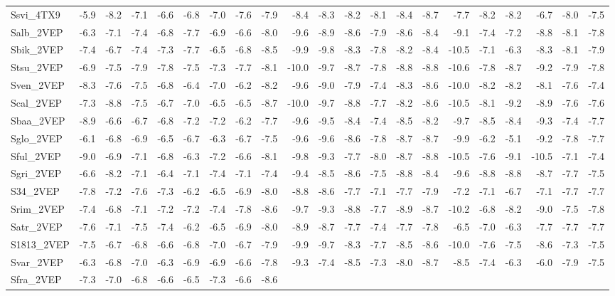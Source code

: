 \documentclass[12pt,twoside]{reedthesis}
\begin{document}
\begin{longtable}[]{@{}lrrrrrrrrrrrrrrrrrrrr@{}}
  Ssvi\_4TX9 & -5.9 & -8.2 & -7.1 & -6.6 & -6.8 & -7.0 & -7.6 & -7.9 &
  -8.4 & -8.3 & -8.2 & -8.1 & -8.4 & -8.7 & -7.7 & -8.2 & -8.2 & -6.7 &
  -8.0 & -7.5\tabularnewline
  Salb\_2VEP & -6.3 & -7.1 & -7.4 & -6.8 & -7.7 & -6.9 & -6.6 & -8.0 &
  -9.6 & -8.9 & -8.6 & -7.9 & -8.6 & -8.4 & -9.1 & -7.4 & -7.2 & -8.8 &
  -8.1 & -7.8\tabularnewline
  Sbik\_2VEP & -7.4 & -6.7 & -7.4 & -7.3 & -7.7 & -6.5 & -6.8 & -8.5 &
  -9.9 & -9.8 & -8.3 & -7.8 & -8.2 & -8.4 & -10.5 & -7.1 & -6.3 & -8.3 &
  -8.1 & -7.9\tabularnewline
  Stsu\_2VEP & -6.9 & -7.5 & -7.9 & -7.8 & -7.5 & -7.3 & -7.7 & -8.1 &
  -10.0 & -9.7 & -8.7 & -7.8 & -8.8 & -8.8 & -10.6 & -7.8 & -8.7 & -9.2 &
  -7.9 & -7.8\tabularnewline
  Sven\_2VEP & -8.3 & -7.6 & -7.5 & -6.8 & -6.4 & -7.0 & -6.2 & -8.2 &
  -9.6 & -9.0 & -7.9 & -7.4 & -8.3 & -8.6 & -10.0 & -8.2 & -8.2 & -8.1 &
  -7.6 & -7.4\tabularnewline
  Scal\_2VEP & -7.3 & -8.8 & -7.5 & -6.7 & -7.0 & -6.5 & -6.5 & -8.7 &
  -10.0 & -9.7 & -8.8 & -7.7 & -8.2 & -8.6 & -10.5 & -8.1 & -9.2 & -8.9 &
  -7.6 & -7.6\tabularnewline
  Sbaa\_2VEP & -8.9 & -6.6 & -6.7 & -6.8 & -7.2 & -7.2 & -6.2 & -7.7 &
  -9.6 & -9.5 & -8.4 & -7.4 & -8.5 & -8.2 & -9.7 & -8.5 & -8.4 & -9.3 &
  -7.4 & -7.7\tabularnewline
  Sglo\_2VEP & -6.1 & -6.8 & -6.9 & -6.5 & -6.7 & -6.3 & -6.7 & -7.5 &
  -9.6 & -9.6 & -8.6 & -7.8 & -8.7 & -8.7 & -9.9 & -6.2 & -5.1 & -9.2 &
  -7.8 & -7.7\tabularnewline
  Sful\_2VEP & -9.0 & -6.9 & -7.1 & -6.8 & -6.3 & -7.2 & -6.6 & -8.1 &
  -9.8 & -9.3 & -7.7 & -8.0 & -8.7 & -8.8 & -10.5 & -7.6 & -9.1 & -10.5 &
  -7.1 & -7.4\tabularnewline
  Sgri\_2VEP & -6.6 & -8.2 & -7.1 & -6.4 & -7.1 & -7.4 & -7.1 & -7.4 &
  -9.4 & -8.5 & -8.6 & -7.5 & -8.8 & -8.4 & -9.6 & -8.8 & -8.8 & -8.7 &
  -7.7 & -7.5\tabularnewline
  S34\_2VEP & -7.8 & -7.2 & -7.6 & -7.3 & -6.2 & -6.5 & -6.9 & -8.0 & -8.8
  & -8.6 & -7.7 & -7.1 & -7.7 & -7.9 & -7.2 & -7.1 & -6.7 & -7.1 & -7.7 &
  -7.7\tabularnewline
  Srim\_2VEP & -7.4 & -6.8 & -7.1 & -7.2 & -7.2 & -7.4 & -7.8 & -8.6 &
  -9.7 & -9.3 & -8.8 & -7.7 & -8.9 & -8.7 & -10.2 & -6.8 & -8.2 & -9.0 &
  -7.5 & -7.8\tabularnewline
  Satr\_2VEP & -7.6 & -7.1 & -7.5 & -7.4 & -6.2 & -6.5 & -6.9 & -8.0 &
  -8.9 & -8.7 & -7.7 & -7.4 & -7.7 & -7.8 & -6.5 & -7.0 & -6.3 & -7.7 &
  -7.7 & -7.7\tabularnewline
  S1813\_2VEP & -7.5 & -6.7 & -6.8 & -6.6 & -6.8 & -7.0 & -6.7 & -7.9 &
  -9.9 & -9.7 & -8.3 & -7.7 & -8.5 & -8.6 & -10.0 & -7.6 & -7.5 & -8.6 &
  -7.3 & -7.5\tabularnewline
  Svar\_2VEP & -6.3 & -6.8 & -7.0 & -6.3 & -6.9 & -6.9 & -6.6 & -7.8 &
  -9.3 & -7.4 & -8.5 & -7.3 & -8.0 & -8.7 & -8.5 & -7.4 & -6.3 & -6.0 &
  -7.9 & -7.5\tabularnewline
  Sfra\_2VEP & -7.3 & -7.0 & -6.8 & -6.6 & -6.5 & -7.3 & -6.6 & -8.6 &

\end{longtable}
\end{document}
